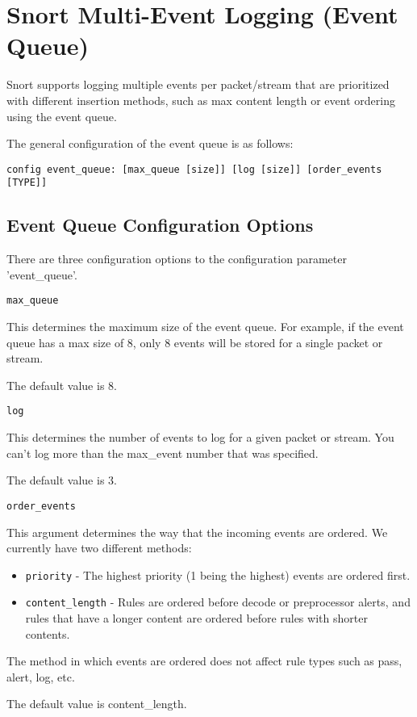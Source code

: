 \documentclass[english]{report}
\newcounter{slistnum}
\newenvironment{slist}
{ \begin{list}{ {\bf \arabic{slistnum}.} }{\usecounter{slistnum} } }
{ \end{list} }
\begin{document}
\clearpage
\section{Snort Multi-Event Logging (Event Queue)\label{eventqueue}}

Snort supports logging multiple events per packet/stream that are prioritized
with different insertion methods, such as max content length or event
ordering using the event queue.

The general configuration of the event queue is as follows:

\begin{verbatim}
config event_queue: [max_queue [size]] [log [size]] [order_events [TYPE]]
\end{verbatim}

\subsection{Event Queue Configuration Options}

There are three configuration options to the configuration parameter
'event\_queue'.

\begin{slist}
\item \texttt{max\_queue}

This determines the maximum size of the event queue.  For example, if the
event queue has a max size of 8, only 8 events will be stored for a single
packet or stream.

The default value is 8.

\item \texttt{log}

This determines the number of events to log for a given packet or stream.
You can't log more than the max\_event number that was specified.

The default value is 3.

\item \texttt{order\_events}

This argument determines the way that the incoming events are ordered.  We
currently have two different methods:

\begin{itemize}
  \item \texttt{priority} - The highest priority (1 being the highest) events are ordered
    first.

  \item \texttt{content\_length} - Rules are ordered before decode or preprocessor alerts,
    and rules that have a longer content are ordered before rules with
    shorter contents.
\end{itemize}

The method in which events are ordered does not affect rule types such as
pass, alert, log, etc.

The default value is content\_length.
\end{slist}
\end{document}
